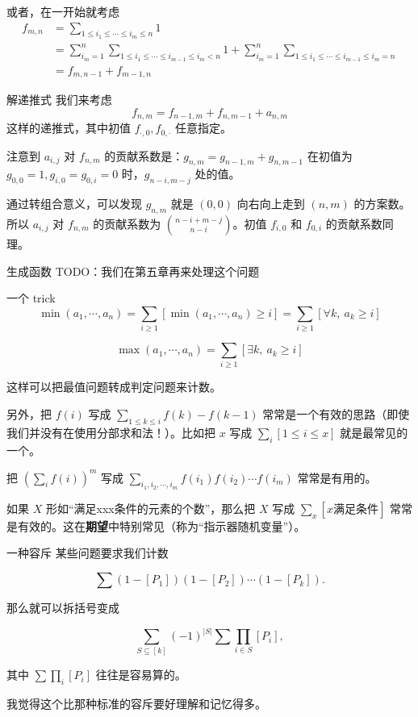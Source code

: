 \begin{frame}
    或者，在一开始就考虑
    $$
    \begin{aligned}
    f_{m,n}&=\sum_{1\le i_1\le \cdots\le i_m\le n}1\\
    &=\sum_{i_m=1}^n\sum_{1\le i_1\le\cdots \le i_{m-1}\le i_m<n}1+\sum_{i_m=1}^n\sum_{1\le i_1\le\cdots \le i_{m-1}\le i_m=n}\\
    &=f_{m,n-1}+f_{m-1,n}
    \end{aligned}
    $$
\end{frame}
\begin{frame}{解递推式}
    我们来考虑
    $$
    f_{n,m}=f_{n-1,m}+f_{n,m-1}+a_{n,m}
    $$
    这样的递推式，其中初值 $f_{\cdot,0},f_{0,\cdot}$ 任意指定。

    注意到 $a_{i,j}$ 对 $f_{n,m}$ 的贡献系数是：$g_{n,m}=g_{n-1,m}+g_{n,m-1}$ 在初值为 $g_{0,0}=1,g_{i,0}=g_{0,i}=0$ 时，$g_{n-i,m-j}$ 处的值。

    通过转组合意义，可以发现 $g_{n,m}$ 就是 $(0,0)$ 向右向上走到 $(n,m)$ 的方案数。所以 $a_{i,j}$ 对 $f_{n,m}$ 的贡献系数为 $\binom{n-i+m-j}{n-i}$。初值 $f_{i,0}$ 和 $f_{0,i}$ 的贡献系数同理。
\end{frame}
\begin{frame}{生成函数}
    TODO：我们在第五章再来处理这个问题
\end{frame}
\begin{frame}{一个 trick}
    $$
    \min(a_1,\cdots,a_n)=\sum_{i\ge 1}[\min(a_1,\cdots,a_n)\ge i]=\sum_{i\ge 1}[\forall k,\ a_k\ge i]
    $$

    $$
    \max(a_1,\cdots,a_n)=\sum_{i\ge 1}[\exists k,\ a_k\ge i]
    $$

    这样可以把最值问题转成判定问题来计数。

    另外，把 $f(i)$ 写成 $\sum_{1\le k\le i} f(k)-f(k-1)$ 常常是一个有效的思路（即使我们并没有在使用分部求和法！）。比如把 $x$ 写成 $\sum_i [1\le i\le x]$ 就是最常见的一个。

    把 $\left(\sum_i f(i)\right)^m$ 写成 $\sum_{i_1,i_2,\cdots,i_m}f(i_1)f(i_2)\cdots f(i_m)$ 常常是有用的。

    如果 $X$ 形如“满足xxx条件的元素的个数”，那么把 $X$ 写成 $\sum_x [x\text{满足条件}]$ 常常是有效的。这在\textbf{期望}中特别常见（称为“指示器随机变量”）。
\end{frame}
\begin{frame}{一种容斥}
    某些问题要求我们计数

    $$
    \sum (1-[P_1])(1-[P_2])\cdots (1-[P_k]).
    $$

    那么就可以拆括号变成

    $$
    \sum_{S\subseteq [k]} (-1)^{|S|}\sum \prod_{i\in S}[P_i],
    $$

    其中 $\sum\prod_i [P_i]$ 往往是容易算的。

    我觉得这个比那种标准的容斥要好理解和记忆得多。
\end{frame}
